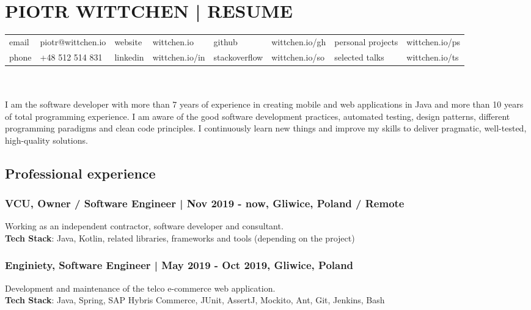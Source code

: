 \documentclass[8pt]{extarticle}
\begin{document}
  \small

  \section*{\large{PIOTR WITTCHEN | RESUME}}

  \begin{tabular}{llllllll}
      email  & piotr@wittchen.io & website  & wittchen.io    & github        & wittchen.io/gh & personal projects & wittchen.io/ps \\
      phone  & +48 512 514 831   & linkedin & wittchen.io/in & stackoverflow & wittchen.io/so & selected talks    & wittchen.io/ts \\
  \end{tabular} \\ \\

    I am the software developer with more than 7 years of experience in creating mobile and web applications in Java and more than 10 years of total programming experience. I am aware of the good software development practices, automated testing, design patterns, different programming paradigms and clean code principles. I continuously learn new things and improve my skills to deliver pragmatic, well-tested, high-quality solutions.

    \subsection*{\normalsize{Professional experience}}

      \subsubsection*{\normalsize{VCU, Owner / Software Engineer | Nov 2019 - now, Gliwice, Poland / Remote}}
      Working as an independent contractor, software developer and consultant.\\
      \textbf{Tech Stack}: Java, Kotlin, related libraries, frameworks and tools (depending on the project)

      \subsubsection*{\normalsize{Enginiety, Software Engineer | May 2019 - Oct 2019, Gliwice, Poland}}
      Development and maintenance of the telco e-commerce web application.\\
      \textbf{Tech Stack}: Java, Spring, SAP Hybris Commerce, JUnit, AssertJ, Mockito, Ant, Git, Jenkins, Bash
\end{document}
